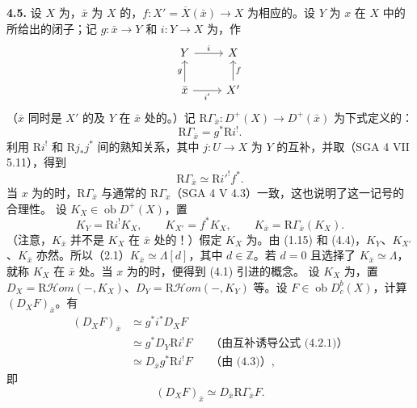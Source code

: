 \textbf{4.5.} 设 $X$ 为，$\bar x$ 为 $X$ 的，$f:X'=\overline X(\bar x)\to X$ 为相应的。设 $Y$ 为 $x$ 在 $X$ 中的所给出的闭子；记 $g:\bar x\to Y$ 和 $i:Y\to X$ 为，作
\[
\begin{tikzcd}
Y\arrow[r,"i"]&X\\
\bar x\arrow[u,"g"]\arrow[r,"i'"']&X'\arrow[u,"f"']
\end{tikzcd}
\]
（$\bar x$ 同时是 $X'$ 的及 $Y$ 在 $\bar x$ 处的。）记 $\mathrm R\Gamma_{\bar x}:D^+(X)\to D^+(\bar x)$ 为下式定义的：
\[
\mathrm R\Gamma_{\bar x}=g^*\mathrm Ri^!.\tag{4.5.1}
\]
利用 $\mathrm Ri^!$ 和 $\mathrm Rj_*j^*$ 间的熟知关系，其中 $j:U\to X$ 为 $Y$ 的互补，并取（SGA 4 VII 5.11），得到
\[
\mathrm R\Gamma_{\bar x}\simeq\mathrm Ri'^!f^*.\tag{4.5.2}
\]
当 $x$ 为的时，$\mathrm R\Gamma_{\bar x}$ 与通常的 $\mathrm R\Gamma_x$（SGA 4 V 4.3）一致，这也说明了这一记号的合理性。
设 $K_X\in\operatorname{ob}D^+(X)$，置
\[
K_Y=\mathrm Ri^!K_X,\qquad K_{X'}=f^*K_X,\qquad K_{\bar x}=\mathrm R\Gamma_{\bar x}(K_X).
\]
（注意，$K_{\bar x}$ 并不是 $K_X$ 在 $\bar x$ 处的！）假定 $K_X$ 为。由 (1.15) 和 (4.4)，$K_Y$、$K_{X'}$、$K_{\bar x}$ 亦然。所以（2.1）$K_{\bar x}\simeq\Lambda[d]$，其中 $d\in\mathbb Z$。若 $d=0$ 且选择了 $K_{\bar x}\simeq\Lambda$，就称 $K_X$ 在 $\bar x$ 处。当 $x$ 为的时，便得到 (4.1) 引进的概念。
设 $K_X$ 为，置 $D_X=\mathrm R\mathscr Hom(-,K_X)$、$D_Y=\mathrm R\mathscr Hom(-,K_Y)$ 等。设 $F\in\operatorname{ob}D_c^b(X)$，计算 $(D_XF)_{\bar x}$。有
\[
\begin{aligned}
(D_XF)_{\bar x}&\simeq g^*i^*D_XF\\
&\simeq g^*D_Y\mathrm Ri^!F&&\text{（由互补诱导公式 (4.2.1)）}\\
&\simeq D_{\bar x}g^*\mathrm Ri^!F&&\text{（由 (4.3)）},
\end{aligned}
\]
即
\[
(D_XF)_{\bar x}\simeq D_{\bar x}\mathrm R\Gamma_{\bar x}F.\tag{4.5.3}
\]
